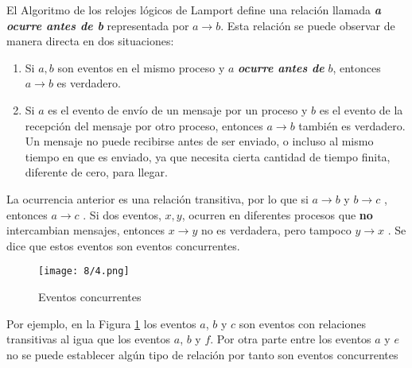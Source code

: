 			
			El Algoritmo de los relojes l\'ogicos de Lamport  define una relación llamada \textit{\textbf{a ocurre antes de b}}  representada por  $a \rightarrow b$. Esta relación se puede observar de manera directa en dos situaciones:
				
						
						 \begin{tcolorbox}
							[colback=red!5!white,colframe=red!75!black,fonttitle=\bfseries, title=Algoritmo de los relojes l\'ogicos de Lamport]
							\begin{enumerate}
								\item Si $a,  b$  son eventos en el mismo proceso y $ a$ \textbf{\textit{ocurre antes de}} $b$, entonces  $ a \rightarrow b $ es verdadero.
								\item Si $a$ es el evento de envío de un mensaje por un proceso y $b$ es el evento de la recepción del mensaje por otro proceso, entonces  $ a \rightarrow b $ también es verdadero. Un mensaje no puede recibirse antes de ser enviado, o incluso al mismo tiempo en que es enviado, ya 	que necesita cierta cantidad de tiempo finita, diferente de cero, para llegar.
							\end{enumerate} 
						\end{tcolorbox}
						
					 
			  La ocurrencia anterior es una relación transitiva, por lo que si   $ a \rightarrow b $  y   $ b \rightarrow c $ , entonces  $ a \rightarrow c $ .
				  Si dos eventos, $x,  y$, ocurren en diferentes procesos que \textbf{no} intercambian mensajes, entonces  $ x \rightarrow y $  no es verdadera, pero tampoco  $ y \rightarrow x $ .
			Se dice que estos eventos son  \gls{eventos concurrentes}.
			
				\begin{figure}%
						\begin{center}
				\texttt{[image: 8/4.png]} 
				\caption{Eventos concurrentes}
				\label{fig:Lamport-conc}
					\end{center}
			\end{figure}
			
			Por ejemplo, en la Figura \ref{fig:Lamport-conc} los eventos $a$, $b$ y $c$ son eventos con relaciones transitivas al igua que los eventos  $a$, $b$ y $f$. Por otra parte entre los eventos  $a$ y $e$ no se puede establecer alg\'un tipo de relaci\'on por tanto son eventos concurrentes
			 	

